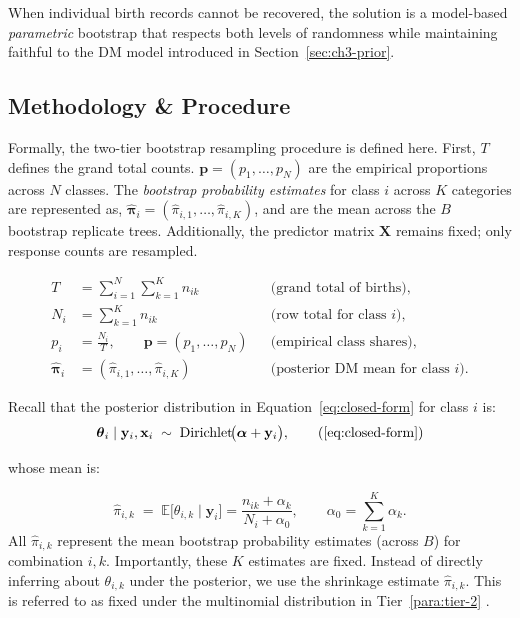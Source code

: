 When individual birth records cannot be recovered, the solution is a model-based \emph{parametric} bootstrap that respects both levels of randomness while maintaining faithful to the DM model introduced in Section~\ref{sec:ch3-prior}.

\subsection{Methodology \& Procedure}
\label{sec:ch3-boot-method}
Formally, the two-tier bootstrap resampling procedure is defined here. First, \(T\) defines the grand total counts. \(\mathbf{p} = (p_1, \dots, p_N)\) are the empirical proportions across \(N\) classes. The \emph{bootstrap probability estimates} for class \(i\)  across \(K\) categories are represented as, \(\boldsymbol{\hat{\pi}}_i = (\hat{\pi}_{i,1}, \dots,\hat{\pi}_{i,K})\), and are the mean across the \(B\) bootstrap replicate trees. Additionally, the predictor matrix \(\mathbf{X}\) remains fixed; only response counts are resampled.

\[
\begin{aligned}
T            &= \sum_{i=1}^{N}\sum_{k=1}^{K} n_{ik}              &&\text{(grand total of births)},\\[2pt]
N_i          &= \sum_{k=1}^{K} n_{ik}                            &&\text{(row total for class \(i\))},\\[2pt]
p_i          &= \frac{N_i}{T}, \qquad
\mathbf{p}   =(p_1,\dots,p_N)                                    &&\text{(empirical class shares)},\\[2pt]
\hat{\boldsymbol{\pi}}_i &= (\hat{\pi}_{i,1},\dots,\hat{\pi}_{i,K}) &&\text{(posterior DM mean for class \(i\))}.
\end{aligned}
\]

Recall that the posterior distribution in Equation~\ref{eq:closed-form} for class \(i\) is:
\[
    \boldsymbol{\theta}_i \mid \mathbf{y}_i, \mathbf{x}_i
    \;\sim\;    \operatorname{Dirichlet}\!\bigl(\boldsymbol{\alpha}+\mathbf{y}_i\bigr),
    \tag{\ref{eq:closed-form}}
\]

whose mean is:

\[
\hat{\pi}_{i,k}
\;=\;
\mathbb{E}\bigl[\theta_{i,k}\mid\mathbf{y}_i\bigr]
=
\frac{n_{ik}+\alpha_k}{N_i+\alpha_0},
\qquad
\alpha_0=\sum_{k=1}^{K}\alpha_k.
\]
All \(\hat{\pi}_{i,k}\) represent the mean bootstrap probability estimates (across \(B\)) for combination \(i,k\). Importantly, these \(K\) estimates are fixed. Instead of directly inferring about \(\theta_{i,k}\) under the posterior, we use the shrinkage estimate \(\hat{\pi}_{i,k}\). This is referred to as fixed under the multinomial distribution in Tier~\ref{para:tier-2} \cite{wiki:shrinkage_statistic, duke}. 

